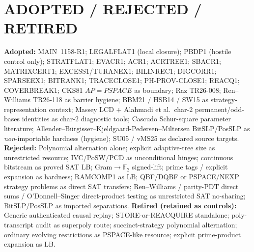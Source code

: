 \documentclass[11pt]{article}
\begin{document}
\section*{ADOPTED / REJECTED / RETIRED}
\textbf{Adopted:} MAIN~1158-R1; LEGALFLAT1 (local closure); PBDP1 (hostile control only);
STRATFLAT1; EVACR1; ACR1; ACRTREE1; SBACR1; MATRIXCERT1; EXCESS1/TURANEX1; BILINREC1;
DIGCORR1; SPARSEEX1; BITRANK1; TRACECLOSE1; PH-PROV-CLOSE1; REACQ1; COVERBREAK1;
CKS81 $AP=PSPACE$ as boundary; Raz TR26-008; Ren--Williams TR26-118 as barrier hygiene;
BBM21 / HSB14 / SW15 as strategy-representation context; Massey LCD + Alahmadi et al.\ char-$2$
permanent/odd-bases identities as char-$2$ diagnostic tools; Cascudo Schur-square parameter
literature; Allender--B\"urgisser--Kjeldgaard-Pedersen--Miltersen BitSLP/PosSLP as
\emph{non}-importable hardness (hygiene); SU05 / vMS25 as declared source targets.
\textbf{Rejected:} Polynomial alternation alone; explicit adaptive-tree size as unrestricted resource;
IVC/PoSW/PCD as unconditional hinges; continuous bitstream as proved SAT LB;
Gram$\to\mathbb F_2$ signed-lift; prime tags / explicit expansion as hardness;
RAMCOMP1 as LB; QBF/DQBF or PSPACE/NEXP strategy problems as direct SAT transfers;
Ren--Williams / parity-PDT direct sums / O'Donnell--Singer direct-product testing as
unrestricted SAT no-sharing; BitSLP/PosSLP as imported separations.
\textbf{Retired (retained as controls):} Generic authenticated causal replay; STORE-or-REACQUIRE
standalone; poly-transcript audit as superpoly route; succinct-strategy polynomial alternation;
ordinary evolving restrictions as PSPACE-like resource; explicit prime-product expansion as LB.
\end{document}
